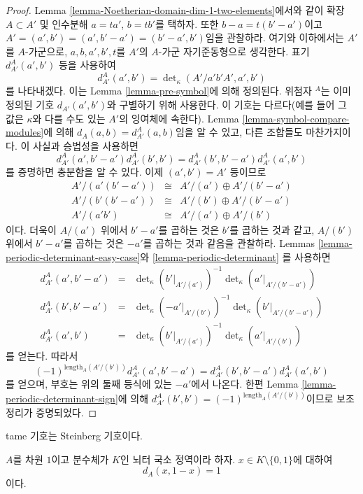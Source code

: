 \begin{proof}
\medskip\noindent
Lemma \ref{lemma-Noetherian-domain-dim-1-two-elements}에서와 같이
확장 $A \subset A'$ 및 인수분해 $a = ta'$, $b = tb'$를 택하자.
또한 $b - a = t(b' - a')$이고
$A' = (a', b') = (a', b' - a') = (b' - a', b')$임을 관찰하라.
여기와 이하에서는 $A'$를 $A$-가군으로, $a, b, a', b', t$를 $A'$의
$A$-가군 자기준동형으로 생각한다. 표기 $d^A_{A'}(a', b')$ 등을
사용하여
$$
d^A_{A'}(a', b')
=
\det\nolimits_\kappa(A'/a'b'A', a', b')
$$
를 나타내겠다. 이는 Lemma \ref{lemma-pre-symbol}에 의해 정의된다.
위첨자 ${}^A$는 이미 정의된 기호 $d_{A'}(a', b')$와 구별하기 위해
사용한다. 이 기호는 다르다(예를 들어 그 값은 $\kappa$와 다를 수도
있는 $A'$의 잉여체에 속한다). Lemma
\ref{lemma-symbol-compare-modules}에 의해
$d_A(a, b) = d^A_{A'}(a, b)$임을 알 수 있고, 다른 조합들도
마찬가지이다. 이 사실과 승법성을 사용하면
$$
d^A_{A'}(a', b' - a') d^A_{A'}(b', b')
=
d^A_{A'}(b', b' - a') d^A_{A'}(a', b')
$$
를 증명하면 충분함을 알 수 있다. 이제 $(a', b') = A'$ 등이므로
$$
\begin{matrix}
A'/(a'(b' - a')) & \cong & A'/(a') \oplus A'/(b' - a') \\
A'/(b'(b' - a')) & \cong & A'/(b') \oplus A'/(b' - a') \\
A'/(a'b') & \cong & A'/(a') \oplus A'/(b')
\end{matrix}
$$
이다. 더욱이 $A/(a')$ 위에서 $b' - a'$를 곱하는 것은 $b'$를 곱하는
것과 같고, $A/(b')$ 위에서 $b' - a'$를 곱하는 것은 $-a'$를 곱하는
것과 같음을 관찰하라. Lemmas
\ref{lemma-periodic-determinant-easy-case}와
\ref{lemma-periodic-determinant}
를 사용하면
$$
\begin{matrix}
d^A_{A'}(a', b' - a') & = &
\det\nolimits_\kappa(b'|_{A'/(a')})^{-1}
\det\nolimits_\kappa(a'|_{A'/(b' - a')}) \\
d^A_{A'}(b', b' - a') & = &
\det\nolimits_\kappa(-a'|_{A'/(b')})^{-1}
\det\nolimits_\kappa(b'|_{A'/(b' - a')}) \\
d^A_{A'}(a', b') & = &
\det\nolimits_\kappa(b'|_{A'/(a')})^{-1}
\det\nolimits_\kappa(a'|_{A'/(b')})
\end{matrix}
$$
를 얻는다. 따라서
$$
(-1)^{\text{length}_A(A'/(b'))}
d^A_{A'}(a', b' - a')
=
d^A_{A'}(b', b' - a') d^A_{A'}(a', b')
$$
를 얻으며, 부호는 위의 둘째 등식에 있는 $-a'$에서 나온다. 한편
Lemma \ref{lemma-periodic-determinant-sign}에 의해
$d^A_{A'}(b', b') = (-1)^{\text{length}_A(A'/(b'))}$이므로 보조정리가
증명되었다.
\end{proof}

\noindent
tame 기호는 Steinberg 기호이다.

\begin{lemma}
\label{lemma-symbol-is-steinberg}
$A$를 차원 $1$이고 분수체가 $K$인 뇌터 국소 정역이라 하자.
$x \in K \setminus \{0, 1\}$에 대하여
$$
d_A(x, 1 -x) = 1
$$
이다.
\end{lemma}


